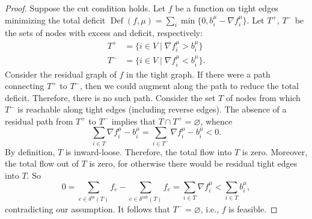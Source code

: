 \documentclass[11pt]{article}
\theoremstyle{definition}
\theoremstyle{definition}
\theoremstyle{definition}
\newcommand{\fu}{f^{\mu}}
\newcommand{\nfiu}{\nabla \fu_i}
\newcommand{\biu}{b_{i}^{\mu}}
\newcommand{\din}{\delta^{\text{in}}}
\newcommand{\dout}{\delta^{\text{out}}}
\DeclareMathOperator{\Def}{Def}
\begin{document}
	\begin{proof}
		Suppose the cut condition holds. Let $f$ be a function on tight edges minimizing
		the total deficit $\Def(f, \mu) = \sum_i \min\{0, \biu - \nfiu\}$. Let
		$T^+$, $T^-$ be the sets of nodes with excess and deficit, respectively:
		\begin{align*}
			T^+ &= \{i \in V \mid \nfiu > \biu \} \\
			T^- &= \{i \in V \mid \nfiu < \biu \}.
		\end{align*}
		Consider the residual graph of $f$ in the tight graph. If there were a path
		connecting $T^+$ to $T^-$, then we could augment along the path
		to reduce the total deficit. Therefore, there is no such path. Consider the
		set $T$ of nodes from which $T^-$ is reachable along tight edges (including reverse edges).
		The absence of a residual path from $T^+$ to $T^-$
        implies that $T \cap T^+ = \varnothing$, whence
		\[ \sum_{i \in T} \nfiu - \biu = \sum_{i \in T^-} \nfiu - \biu < 0. \]
		By definition, $T$ is inward-loose. Therefore, the total flow into $T$ is zero.
        Moreover, the total flow out of $T$ is zero, for otherwise there would be
        residual tight edges into $T$. So
		\[ 0 = \sum_{e \in \din(T)} f_e - \sum_{e \in \dout(T)} f_e
		     = \sum_{i \in T} \nfiu < \sum_{i \in T} \biu, \]
		contradicting our assumption. It follows that $T^- = \varnothing$, i.e., $f$
		is feasible.
	\end{proof}
    
\end{document}
